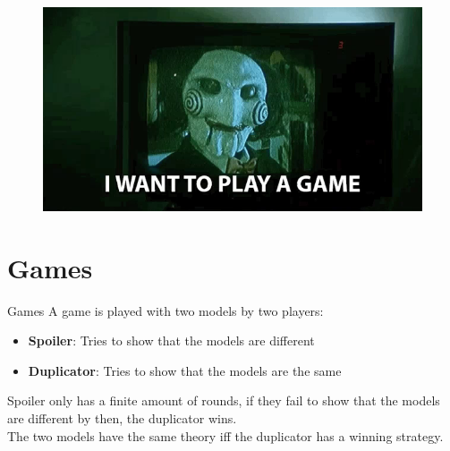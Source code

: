\documentclass{beamer}
\begin{document}
\begin{frame}
	\begin{figure}[h]
		\includegraphics[width=1\textwidth]{i_want_to_play_a_game_meme}
	\end{figure}
\end{frame}


\section*{Games}

\begin{frame}{Games}
	A game is played with two models by two players:
	\begin{itemize}
		\item \textbf{Spoiler}: Tries to show that the models are different
		\item \textbf{Duplicator}: Tries to show that the models are the same
	\end{itemize}
	Spoiler only has a finite amount of rounds, if they fail to show that the models are different by then, the duplicator wins.
	\\[8pt]
	The two models have the same theory iff the duplicator has a winning strategy.
\end{frame}
\end{document}
